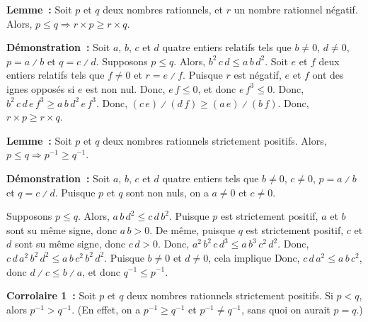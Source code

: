     \done

\medskip

\noindent\textbf{Lemme :} Soit $p$ et $q$ deux nombres rationnels, et $r$ un nombre rationnel négatif. 
    Alors, $p \leq q \Rightarrow r \times p \geq r \times q$.

\medskip

\noindent\textbf{Démonstration :}
    Soit $a$, $b$, $c$ et $d$ quatre entiers relatifs tels que $b \neq 0$, $d \neq 0$, $p = a \divslash b$ et $q = c \divslash d$.
    Supposons $p \leq q$.
    Alors, $b^2 \, c \, d \leq a \, b \, d^2$.
    Soit $e$ et $f$ deux entiers relatifs tels que $f \neq 0$ et $r = e \divslash f$.
    Puisque $r$ est négatif, $e$ et $f$ ont des ignes opposés si $e$ est non nul. 
    Donc, $e \, f \leq 0$, et donc $e \, f^3 \leq 0$.
    Donc, $b^2 \, c \, d \, e \, f^3 \geq a \, b \, d^2 \, e \, f^3$. 
    Donc, $(c \, e) \divslash (d \, f) \geq (a \, e) \divslash (b \, f)$. 
    Donc, $r \times p \geq r \times q$.

    \done

\medskip

\noindent\textbf{Lemme :} Soit $p$ et $q$ deux nombres rationnels strictement positifs. 
    Alors, $p \leq q \Rightarrow p^{-1} \geq q^{-1}$.

\medskip

\noindent\textbf{Démonstration :} 
    Soit $a$, $b$, $c$ et $d$ quatre entiers tels que $b \neq 0$, $c \neq 0$, $p = a \divslash b$ et $q = c \divslash d$.
    Puisque $p$ et $q$ sont non nuls, on a $a \neq 0$ et $c \neq 0$.
    
    Supposons $p \leq q$.
    Alors, $a \, b \, d^2 \leq c \, d \, b^2$.
    Puisque $p$ est strictement positif, $a$ et $b$ sont su même signe, donc $a \, b > 0$.
    De même, puisque $q$ est strictement positif, $c$ et $d$ sont su même signe, donc $c \, d > 0$.
    Donc, $a^2 \, b^2 \, c \, d^3 \leq a \, b^3 \, c^2 \, d^2$.
    Donc, $c \, d \, a^2 \, b^2 \, d^2 \leq a \, b \, c^2 \, b^2 \, d^2$.
    Puisque $b \neq 0$ et $d \neq 0$, cela implique
    Donc, $c \, d \, a^2 \leq a \, b \, c^2$, donc $d \divslash c \leq b \divslash a$, et donc $q^{-1} \leq p^{-1}$.

    \done

\medskip

\noindent\textbf{Corrolaire 1 :} Soit $p$ et $q$ deux nombres rationnels strictement positifs. 
    Si $p < q$, alors $p^{-1} > q^{-1}$. 
    (En effet, on a $p^{-1} \geq q^{-1}$ et $p^{-1} \neq q^{-1}$, sans quoi on aurait $p = q$.)

